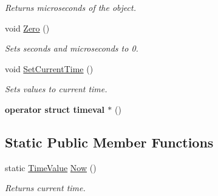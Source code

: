 \begin{DoxyCompactItemize}
\begin{DoxyCompactList}\small\item\em Returns microseconds of the object. \end{DoxyCompactList}\item 
\hypertarget{class_common_1_1_time_value_a8288a4d18e721f9a23d2fbb9ca2c9532}{void \hyperlink{class_common_1_1_time_value_a8288a4d18e721f9a23d2fbb9ca2c9532}{Zero} ()}\label{class_common_1_1_time_value_a8288a4d18e721f9a23d2fbb9ca2c9532}

\begin{DoxyCompactList}\small\item\em Sets seconds and microseconds to 0. \end{DoxyCompactList}\item 
\hypertarget{class_common_1_1_time_value_a5aa68d6d56c6a9222a921bc1658365dd}{void \hyperlink{class_common_1_1_time_value_a5aa68d6d56c6a9222a921bc1658365dd}{Set\-Current\-Time} ()}\label{class_common_1_1_time_value_a5aa68d6d56c6a9222a921bc1658365dd}

\begin{DoxyCompactList}\small\item\em Sets values to current time. \end{DoxyCompactList}\item 
\hypertarget{class_common_1_1_time_value_abce9a10e223e47fa14b32b06ca16293f}{{\bfseries operator struct timeval $\ast$} ()}\label{class_common_1_1_time_value_abce9a10e223e47fa14b32b06ca16293f}

\end{DoxyCompactItemize}
\subsection*{Static Public Member Functions}
\begin{DoxyCompactItemize}
\item 
\hypertarget{class_common_1_1_time_value_af99f84df29cfbfd8a560c20a70108037}{static \hyperlink{class_common_1_1_time_value}{Time\-Value} \hyperlink{class_common_1_1_time_value_af99f84df29cfbfd8a560c20a70108037}{Now} ()}\label{class_common_1_1_time_value_af99f84df29cfbfd8a560c20a70108037}

\begin{DoxyCompactList}\small\item\em Returns current time. \end{DoxyCompactList}\end{DoxyCompactItemize}

